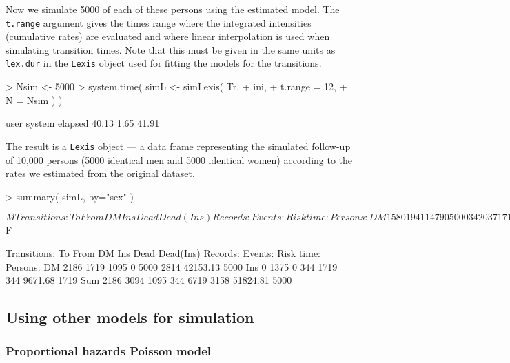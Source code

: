 \documentclass[a4paper,twoside,12pt]{report}
\begin{document}
Now we simulate 5000 of each of these persons using the estimated
model. The \texttt{t.range} argument gives the times range where the
integrated intensities (cumulative rates) are evaluated and where
linear interpolation is used when simulating transition times. Note
that this must be given in the same units as \texttt{lex.dur} in the
\texttt{Lexis} object used for fitting the models for the transitions.
\begin{Schunk}
\begin{Sinput}
> Nsim <- 5000
> system.time( simL <- simLexis( Tr,
+                               ini,
+                           t.range = 12,
+                                 N = Nsim ) )
\end{Sinput}
\begin{Soutput}
   user  system elapsed 
  40.13    1.65   41.91 
\end{Soutput}
\end{Schunk}
The result is a \texttt{Lexis} object --- a data frame representing
the simulated follow-up of 10,000 persons (5000 identical men and 5000
identical women) according to the rates we estimated from the original
dataset.
\begin{Schunk}
\begin{Sinput}
> summary( simL, by="sex" )
\end{Sinput}
\begin{Soutput}
$M
     
Transitions:
     To
From    DM  Ins Dead Dead(Ins)  Records:  Events: Risk time:  Persons:
  DM  1580 1941 1479         0      5000     3420   37171.47      5000
  Ins    0 1324    0       617      1941      617   10760.92      1941
  Sum 1580 3265 1479       617      6941     4037   47932.39      5000

$F
     
Transitions:
     To
From    DM  Ins Dead Dead(Ins)  Records:  Events: Risk time:  Persons:
  DM  2186 1719 1095         0      5000     2814   42153.13      5000
  Ins    0 1375    0       344      1719      344    9671.68      1719
  Sum 2186 3094 1095       344      6719     3158   51824.81      5000
\end{Soutput}
\end{Schunk}

\subsection{Using other models for simulation}

\subsubsection{Proportional hazards Poisson model}
\end{document}
